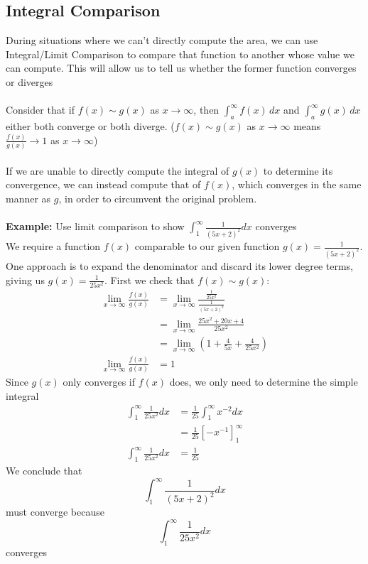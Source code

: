 \documentclass{report}
\begin{document}
\subsection{Integral Comparison} %
During situations where we can't directly compute the area, we can use Integral/Limit 
Comparison to compare that function to another whose value we can compute. This will allow
us to tell us whether the former function converges or diverges\\
\vspace{1mm}\\
Consider that if $f(x)\sim g(x)$ as $x\to\infty$, then
$\int_a^\infty f(x)\,dx$ and $\int_a^\infty g(x)\,dx$ either both converge or both diverge.
($f(x)\sim g(x)$ as $x\to\infty$ means $\frac{f(x)}{g(x)}\to1$ as $x\to\infty$)\\
\vspace{1mm}\\
If we are unable to directly compute the integral of $g(x)$ to determine its convergence, 
we can instead compute that of $f(x)$, which converges in the same manner as $g$, in order
to circumvent the original problem.\\
\vspace{1mm}\\
\textbf{Example: }Use limit comparison to show $\int^\infty_1\frac{1}{(5x+2)^2}dx$ converges\\
We require a function $f(x)$ comparable to our given function $g(x)=\frac{1}{(5x+2)^2}$. 
One approach is to expand the denominator and discard its lower degree terms, giving us 
$g(x)=\frac{1}{25x^2}$. First we check that $f(x)\sim g(x)$:
\begin{align*}
\lim_{x\to\infty}\frac{f(x)}{g(x)}
&=\lim_{x\to\infty}\frac{\frac{1}{25x^2}}{\frac{1}{(5x+2)^2}}\\
&=\lim_{x\to\infty}\frac{25x^2+20x+4}{25x^2}\\
&=\lim_{x\to\infty}\left(1+\frac{4}{5x}
+\frac{4}{25x^2}\right)\\
\lim_{x\to\infty}\frac{f(x)}{g(x)}&=1
\end{align*}
Since $g(x)$ only converges if $f(x)$ does, we only need to determine the simple integral
\begin{align*}
\int_1^\infty\frac{1}{25x^2}dx&=\frac{1}{25}\int_1^\infty x^{-2}dx\\
&=\frac{1}{25}\left[-x^{-1}\right]_1^\infty\\
\int_1^\infty\frac{1}{25x^2}dx&=\frac{1}{25}
\end{align*}
We conclude that
\begin{equation*}
\int^\infty_1\frac{1}{(5x+2)^2}dx
\end{equation*}
must converge because
\begin{equation*}
\int^\infty_1\frac{1}{25x^2}dx
\end{equation*}
converges
\newpage
\end{document}

